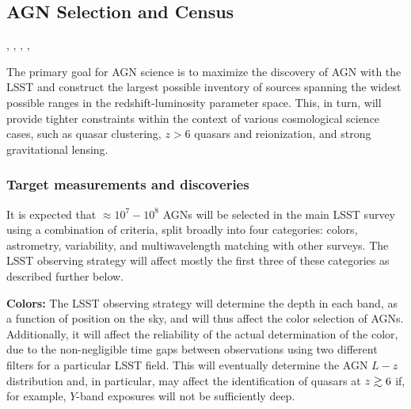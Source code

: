 %
%

\subsection{AGN Selection and Census}
\def\secname{\chpname:census}\label{sec:\secname}

,
,
,
,

The primary goal for AGN science is to maximize the discovery of AGN
with the LSST and construct the largest possible inventory of sources
spanning the widest possible ranges in the redshift-luminosity parameter
space. This, in turn, will provide tighter constraints within the context
of various cosmological science cases, such as quasar clustering,
$z>6$ quasars and reionization, and strong gravitational lensing.


\subsubsection{Target measurements and discoveries}
\label{sec:\secname:targets}

It is expected that $\approx 10^7 - 10^8$ AGNs will be selected in the
main LSST survey using a combination of criteria, split broadly into
four categories: colors, astrometry, variability, and multiwavelength
matching with other surveys. The LSST observing strategy will affect
mostly the first three of these categories as described further below.

{\bf Colors:} The LSST observing strategy will determine the depth in each band,
as a function of position on the sky, and will thus affect the color selection
of AGNs. Additionally, it will affect the reliability of the actual
determination of the color, due to the non-negligible time gaps between
observations using two different filters for a particular LSST field. This will
eventually determine the AGN $L-z$ distribution and, in particular, may affect
the identification of quasars at $z\gtrsim 6$ if, for example, $Y$-band exposures
will not be sufficiently deep.

